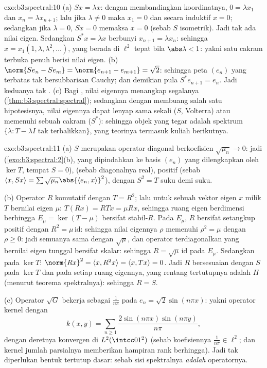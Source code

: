 \begin{solution}{exo:b3:spectral:10}
(a) $Sx = \lambda x$: dengan membandingkan koordinatnya, $0 = \lambda
x_1$ dan $x_n = \lambda x_{n+1}$; lalu jika $\lambda \ne 0$ maka
$x_1 = 0$ dan secara induktif $x = 0$; sedangkan jika $\lambda = 0$, $Sx = 0$
memaksa $x = 0$ (sebab $S$ isometrik). Jadi tak ada nilai eigen. Sedangkan $S^*x =
\lambda x$ berbunyi $x_{n+1} = \lambda x_n$: sehingga $x =
x_1(1, \lambda, \lambda^2, \dots)$, yang berada di $\ell^2$ tepat bila
$\abs\lambda < 1$: yakni satu cakram terbuka penuh berisi nilai eigen.
(b) $\norm{Se_n - Se_m} = \norm{e_{n+1} - e_{m+1}} = \sqrt2$:
sehingga peta $(e_n)$ yang terbatas tak bersubbarisan Cauchy;
dan demikian pula $S^*e_{n+1} = e_n$. Jadi keduanya tak .
(c) Bagi  , nilai eigennya
menangkap segalanya (\cref{thm:b3:spectral:spectral}); sedangkan dengan membuang
salah satu hipotesisnya, nilai eigennya dapat lenyap sama sekali ($S$,
Volterra) atau memenuhi sebuah cakram ($S^*$): sehingga objek yang tegar adalah
spektrum $\{\lambda : T - \lambda I \text{ tak terbalikkan}\}$,
yang teorinya termasuk kuliah berikutnya.
\end{solution}

\begin{solution}{exo:b3:spectral:11}
(a) $S$ merupakan operator diagonal berkoefisien
$\sqrt{\mu_n} \to 0$: jadi 
(\cref{exo:b3:spectral:2}(b), yang dipindahkan ke basis
$(e_n)$ yang dilengkapkan oleh $\ker T$, tempat $S = 0$), 
(sebab diagonalnya real), positif (sebab $\langle x, Sx\rangle =
\sum\sqrt{\mu_n}\abs{\langle e_n, x\rangle}^2$), dengan $S^2 =
T$ suku demi suku.

(b) Operator $R$ komutatif dengan $T = R^2$; lalu untuk sebuah vektor eigen $x$ milik
$T$ bernilai eigen $\mu$: $T(Rx) = RTx = \mu Rx$, sehingga
ruang eigen berdimensi berhingga $E_\mu = \ker(T - \mu)$ bersifat
stabil-$R$. Pada $E_\mu$, $R$ bersifat setangkup positif dengan $R^2
= \mu\,\mathrm{id}$: sehingga nilai eigennya $\rho$ memenuhi $\rho^2
= \mu$ dengan $\rho \geq 0$: jadi semuanya sama dengan $\sqrt\mu$, dan
operator terdiagonalkan yang bernilai eigen tunggal bersifat skalar:
sehingga $R = \sqrt\mu\,\mathrm{id}$ pada $E_\mu$. Sedangkan pada $\ker T$: $\norm
{Rx}^2 = \langle x, R^2x\rangle = \langle x, Tx\rangle = 0$.
Jadi $R$ bersesuaian dengan $S$ pada $\ker T$ dan pada setiap ruang eigennya,
yang rentang tertutupnya adalah $H$ (menurut teorema spektralnya): sehingga $R = S$.

(c) Operator $\sqrt G$ bekerja sebagai $\frac1{n\pi}$ pada $e_n =
\sqrt2\sin(n\pi x)$: yakni operator kernel dengan
\[
k(x, y) = \sum_{n\geq1}\frac{2\sin(n\pi x)\sin(n\pi
y)}{n\pi},
\]
dengan deretnya konvergen di $L^2(\intcc01^2)$ (sebab koefisiennya
$\frac1{n\pi} \in \ell^2$; dan kernel jumlah parsialnya memberikan
hampiran rank berhingga). Jadi tak diperlukan bentuk tertutup dasar:
sebab sisi spektralnya \emph{adalah} operatornya.
\end{solution}


